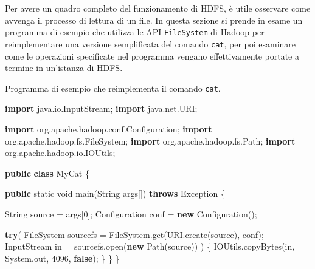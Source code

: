 \documentclass[italian,a4paper, twoside, 12pt]{report}
\newenvironment{Shaded}{}{}
\newcommand{\KeywordTok}[1]{\textcolor[rgb]{0.00,0.44,0.13}{\textbf{#1}}}
\newcommand{\DataTypeTok}[1]{\textcolor[rgb]{0.56,0.13,0.00}{#1}}
\newcommand{\DecValTok}[1]{\textcolor[rgb]{0.25,0.63,0.44}{#1}}
\newcommand{\ImportTok}[1]{#1}
\newcommand{\FunctionTok}[1]{\textcolor[rgb]{0.02,0.16,0.49}{#1}}
\newcommand{\BuiltInTok}[1]{#1}
\newcommand{\NormalTok}[1]{#1}
\begin{document}
Per avere un quadro completo del funzionamento di HDFS, è utile
osservare come avvenga il processo di lettura di un file. In questa
sezione si prende in esame un programma di esempio che utilizza le API
\texttt{FileSystem} di Hadoop per reimplementare una versione
semplificata del comando \texttt{cat}, per poi esaminare come le
operazioni specificate nel programma vengano effettivamente portate a
termine in un'istanza di HDFS.

\begin{codelisting}

\caption{Programma di esempio che reimplementa il comando \texttt{cat}.}

\hypertarget{lst:hdfs-cat}{\label{lst:hdfs-cat}}
\begin{Shaded}
\begin{Highlighting}[numbers=left,,]
\KeywordTok{import}\ImportTok{ java.io.InputStream;}
\KeywordTok{import}\ImportTok{ java.net.URI;}

\KeywordTok{import}\ImportTok{ org.apache.hadoop.conf.Configuration;}
\KeywordTok{import}\ImportTok{ org.apache.hadoop.fs.FileSystem;}
\KeywordTok{import}\ImportTok{ org.apache.hadoop.fs.Path;}
\KeywordTok{import}\ImportTok{ org.apache.hadoop.io.IOUtils;}

\KeywordTok{public} \KeywordTok{class}\NormalTok{ MyCat \{}

    \KeywordTok{public} \DataTypeTok{static} \DataTypeTok{void} \FunctionTok{main}\NormalTok{(}\BuiltInTok{String}\NormalTok{ args[]) }\KeywordTok{throws} \BuiltInTok{Exception}\NormalTok{ \{}

        \BuiltInTok{String}\NormalTok{ source = args[}\DecValTok{0}\NormalTok{];}
        \BuiltInTok{Configuration}\NormalTok{ conf = }\KeywordTok{new} \BuiltInTok{Configuration}\NormalTok{();}

        \KeywordTok{try}\NormalTok{(}
\NormalTok{            FileSystem sourcefs = FileSystem.}\FunctionTok{get}\NormalTok{(}\BuiltInTok{URI}\NormalTok{.}\FunctionTok{create}\NormalTok{(source), conf);}
            \BuiltInTok{InputStream}\NormalTok{ in = sourcefs.}\FunctionTok{open}\NormalTok{(}\KeywordTok{new} \FunctionTok{Path}\NormalTok{(source))}
\NormalTok{        ) \{}
\NormalTok{            IOUtils.}\FunctionTok{copyBytes}\NormalTok{(in, }\BuiltInTok{System}\NormalTok{.}\FunctionTok{out}\NormalTok{, }\DecValTok{4096}\NormalTok{, }\KeywordTok{false}\NormalTok{);}
\NormalTok{        \}}
\NormalTok{    \}}
\NormalTok{\}}
\end{Highlighting}
\end{Shaded}

\end{codelisting}
\end{document}
